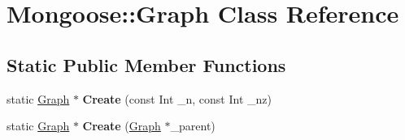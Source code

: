 \hypertarget{class_mongoose_1_1_graph}{}\section{Mongoose\+:\+:Graph Class Reference}
\label{class_mongoose_1_1_graph}
\subsection*{Static Public Member Functions}
\begin{DoxyCompactItemize}
\item 
static \hyperlink{class_mongoose_1_1_graph}{Graph} $\ast$ {\bfseries Create} (const Int \+\_\+n, const Int \+\_\+nz)\hypertarget{class_mongoose_1_1_graph_a9a5866d6b7a5a000535e1d8b2cc086ee}{}\label{class_mongoose_1_1_graph_a9a5866d6b7a5a000535e1d8b2cc086ee}

\item 
static \hyperlink{class_mongoose_1_1_graph}{Graph} $\ast$ {\bfseries Create} (\hyperlink{class_mongoose_1_1_graph}{Graph} $\ast$\+\_\+parent)\hypertarget{class_mongoose_1_1_graph_a14c7311df4522a4d0730cd87fee6eb2b}{}\label{class_mongoose_1_1_graph_a14c7311df4522a4d0730cd87fee6eb2b}

\end{DoxyCompactItemize}

